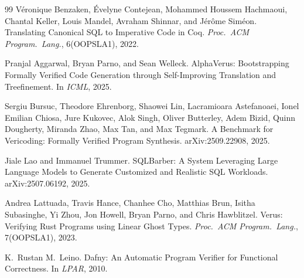 \documentclass[sigconf, nonacm]{acmart}
\begin{document}
\begin{thebibliography}{99}
V{\'e}ronique Benzaken, {\'E}velyne Contejean, Mohammed Houssem Hachmaoui, Chantal Keller, Louis Mandel, Avraham Shinnar, and J{\'e}r{\^o}me Sim{\'e}on.
\newblock Translating Canonical SQL to Imperative Code in Coq.
\newblock \emph{Proc.\ ACM Program.\ Lang.}, 6(OOPSLA1), 2022.

Pranjal Aggarwal, Bryan Parno, and Sean Welleck.
\newblock AlphaVerus: Bootstrapping Formally Verified Code Generation through Self-Improving Translation and Treefinement.
\newblock In \emph{ICML}, 2025.

Sergiu Bursuc, Theodore Ehrenborg, Shaowei Lin, Lacramioara Astefanoaei, Ionel Emilian Chiosa, Jure Kukovec, Alok Singh, Oliver Butterley, Adem Bizid, Quinn Dougherty, Miranda Zhao, Max Tan, and Max Tegmark.
\newblock A Benchmark for Vericoding: Formally Verified Program Synthesis.
\newblock arXiv:2509.22908, 2025.

Jiale Lao and Immanuel Trummer.
\newblock SQLBarber: A System Leveraging Large Language Models to Generate Customized and Realistic SQL Workloads.
\newblock arXiv:2507.06192, 2025.

Andrea Lattuada, Travis Hance, Chanhee Cho, Matthias Brun, Isitha Subasinghe, Yi Zhou, Jon Howell, Bryan Parno, and Chris Hawblitzel.
\newblock Verus: Verifying Rust Programs using Linear Ghost Types.
\newblock \emph{Proc.\ ACM Program.\ Lang.}, 7(OOPSLA1), 2023.

K.\ Rustan M.\ Leino.
\newblock Dafny: An Automatic Program Verifier for Functional Correctness.
\newblock In \emph{LPAR}, 2010.

\end{thebibliography}
\end{document}
